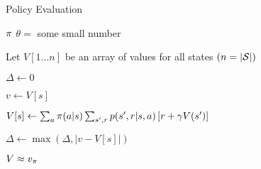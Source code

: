 
\begin{algorithm}
\caption{Policy Evaluation}
\label{alg:poleval}

\begin{algorithmic}[1]

	\Require $\pi$
	\Require $\theta =$ some small number

	\State Let $V[1...n]$ be an array of values for all states
	$(n = |\mathcal{S}|)$

	\Repeat

		\State $\Delta \gets 0$


			\State $v \gets V[s]$

			\State $V[s] \gets
				\sum_a {\pi(a|s)}
				\sum_{s',r} {p(s',r|s,a)\left[r + \gamma V(s')\right]}$

			\State $\Delta \gets \max(\Delta,|v-V[s]|)$

		\EndFor

	\Until{$\Delta < \theta$}

	\State \Return $V \approx v_\pi$

\end{algorithmic}

\end{algorithm}

